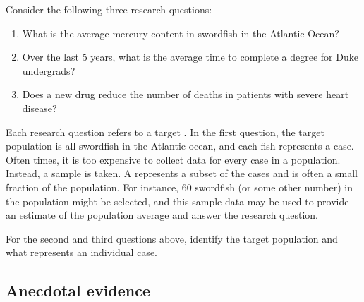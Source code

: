 \noindent%
Consider the following three research questions:
\begin{enumerate}
\setlength{\itemsep}{0mm}
\item
    What is the average mercury content in swordfish
    in the Atlantic Ocean?
\item
    \label{timeToGraduationQuestionForUCLAStudents}%
    Over the last 5 years, what is the average time
    to complete a degree for Duke undergrads?
\item
    \label{identifyPopulationOfStentStudy}%
    Does a new drug reduce the number of deaths in patients
    with severe heart disease?
\end{enumerate}
Each research question refers to a target . In the first question, the target population is all swordfish in the Atlantic ocean, and each fish represents a case. Often times, it is too expensive to collect data for every case in a population. Instead, a sample is taken. A  represents a subset of the cases and is often a small fraction of the population. For instance, 60 swordfish (or some other number) in the population might be selected, and this sample data may be used to provide an estimate of the population average and answer the research question.

\begin{exercisewrap}
\begin{nexercise}\label{identifyingThePopulationForTwoQuestionsInPopAndSampSubsection}%
For the second and third questions above,
identify the target population and what
represents an individual case.\footnotemark
\end{nexercise}
\end{exercisewrap}


\subsection{Anecdotal evidence}
\label{anecdotalEvidenceSubsection}

